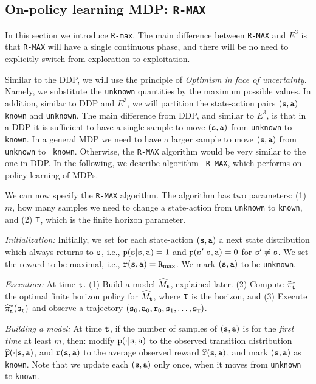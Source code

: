 \subsection{On-policy learning MDP: {\tt R-MAX}}

In this section we introduce {\tt R-max}. The main difference
between {\tt R-MAX} and $E^3$ is that {\tt R-MAX} will have a single
continuous phase, and there will be no need to explicitly switch
from exploration to exploitation.

Similar to the DDP, we will use the principle of {\em Optimism in
face of uncertainty}. Namely, we substitute the \texttt{unknown} quantities
by the maximum possible values.
%
In addition, similar to DDP and $E^3$, we will partition the
state-action pairs $({\tt s},{\tt a})$ \texttt{known} and \texttt{unknown}.
%
The main difference from DDP, and similar to $E^3$, is that in a DDP
it is sufficient to have a single sample to move $({\tt s},{\tt a})$
from \texttt{unknown} to \texttt{known}. In a general MDP we need to have a
larger sample to move $({\tt s},{\tt a})$ from \texttt{unknown} to {\tt
known}. Otherwise, the {\tt R-MAX} algorithm would be very similar
to the one in DDP. In the following, we describe algorithm {\tt
R-MAX}, which performs on-policy learning of MDPs.

We can now specify the {\tt R-MAX} algorithm. The algorithm has two
parameters: (1) $m$, how many samples we need to change a
state-action from \texttt{unknown} to \texttt{known}, and (2) ${\tt T}$, which is
the finite horizon parameter.

{\em Initialization:} Initially, we set for each state-action $({\tt s},{\tt a})$
a next state distribution which always returns to ${\tt s}$, i.e.,
${\tt p}({\tt s}|{\tt s},{\tt a})=1$ and ${\tt p}({\tt s}'|{\tt s},{\tt a})=0$ for
${\tt s}'\neq {\tt s}$. We set the reward to be maximal, i.e.,
${\tt r}({\tt s},{\tt a})={\tt R}_{\max }$. We mark $({\tt s},{\tt a})$ to be
\texttt{unknown}.

{\em Execution:} At time ${\tt t}$. (1) Build a model
$\widehat{M}_{\tt t}$, explained later. (2) Compute
$\widehat{\pi}^*_{\tt t}$ the optimal finite horizon policy for
$\widehat{M}_{\tt t}$, where ${\tt T}$ is the horizon, and (3) Execute
$\widehat{\pi}^*_{\tt t}({\tt s}_{\tt t})$ and
observe a trajectory $({\tt s}_0,{\tt a}_0,{\tt r}_0,{\tt s}_1, \ldots, {\tt s}_{\tt T})$.

{\em Building a model:} At time ${\tt t}$, if the number of samples
of $({\tt s},{\tt a})$ is for the {\em first time} at least $m$,
then: modify ${\tt p}(\cdot|{\tt s},{\tt a})$ to the observed transition
distribution $\widehat{{\tt p}}(\cdot|{\tt s},{\tt a})$, and ${\tt r}({\tt s},{\tt a})$ to the average observed
reward $\widehat{{\tt r}}({\tt s},{\tt a})$, and mark $({\tt s},{\tt a})$ as {\tt
known}. Note that we update each $({\tt s},{\tt a})$ only once, when
it moves from \texttt{unknown} to \texttt{known}.


